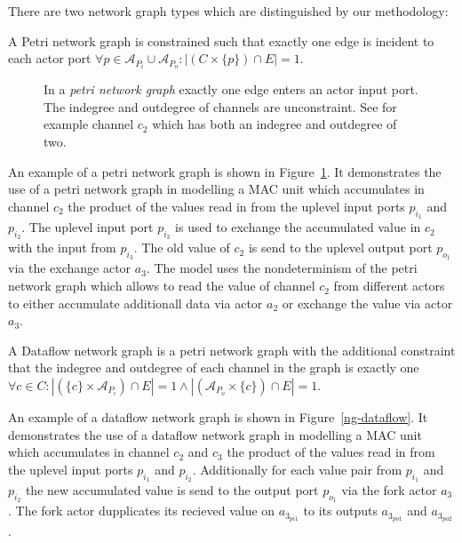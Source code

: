 There are two network graph types which are distinguished by our methodology:

\begin{definition}\label{petri-network-graph}
  A Petri network graph is constrained such that exactly
  one edge is incident to each actor port
  $\forall{p \in \mathcal{A}_{P_{i}} \cup \mathcal{A}_{P_{o}}}: |(C \times \{p\}) \cap E| = 1$.
\end{definition}

\begin{figure}
\centering

\caption{\label{ng-petri}
  In a \emph{petri network graph} exactly
  one edge enters an actor input port. The
  indegree and outdegree of channels are
  unconstraint. See for example channel $c_2$
  which has both an indegree and outdegree of
  two.}
\end{figure}

  An example of a petri network graph is shown in Figure~\ref{ng-petri}.
  It demonstrates the use of a petri network graph in modelling
  a MAC unit which accumulates in channel $c_2$ the product of
  the values read in from the uplevel input ports $p_{i_1}$ and $p_{i_2}$.
  The uplevel input port $p_{i_3}$ is used to exchange the
  accumulated value in $c_2$ with the input from $p_{i_3}$. The
  old value of $c_2$ is send to the uplevel output port $p_{o_1}$
  via the exchange actor $a_3$. The model uses the nondeterminism
  of the petri network graph which allows to read the value of channel
  $c_2$ from different actors to either accumulate additionall
  data via actor $a_2$ or exchange the value via actor $a_3$.

\begin{definition}\label{dataflow-network-graph}
  A Dataflow network graph is a petri network graph with the additional constraint
  that the indegree and outdegree of each channel in the graph is exactly one
  $\forall{c \in C}: |(\{c\} \times \mathcal{A}_{P_{i}}) \cap E| = 1 \wedge
                    |(\mathcal{A}_{P_{o}} \times \{c\}) \cap E| = 1$.
\end{definition}

  An example of a dataflow network graph is shown in Figure~\ref{ng-dataflow}.
  It demonstrates the use of a dataflow network graph in modelling
  a MAC unit which accumulates in channel $c_2$ and $c_3$ the product of
  the values read in from the uplevel input ports $p_{i_1}$ and $p_{i_2}$.
  Additionally for each value pair from $p_{i_1}$ and $p_{i_2}$ the
  new accumulated value is send to the output port $p_{o_1}$ via
  the fork actor $a_3$. The fork actor dupplicates its recieved
  value on $a_{3_{pi1}}$ to its outputs $a_{3_{po1}}$ and $a_{3_{po2}}$.


